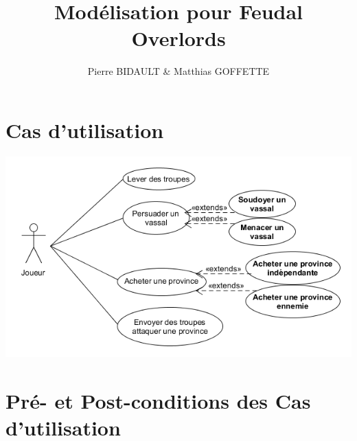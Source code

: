 \documentclass[12pt,a4paper]{article}
\author{Pierre BIDAULT \& Matthias GOFFETTE}
\title{Modélisation pour Feudal Overlords}
\begin{document}
\maketitle

\section{Cas d'utilisation}

\includegraphics[scale=0.7]{Diagramme_Cas_Utilisation/Diagramme_Cas_Utilisation.png}

\newpage

\section{Pré- et Post-conditions des Cas d'utilisation}
\end{document}

